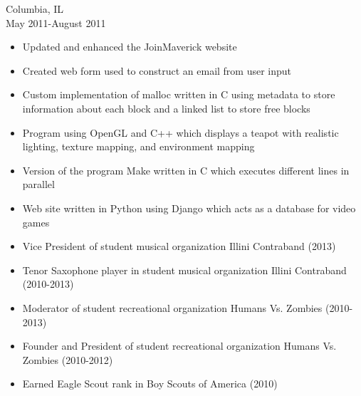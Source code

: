 \documentclass[11pt]{article}
\begin{document}
     \hfill Columbia, IL\\
     \hfill May 2011-August 2011
    \begin{itemize}[noitemsep,topsep=0pt,leftmargin=52pt]
      \item Updated and enhanced the JoinMaverick website
      \item Created web form used to construct an email from user input
    \end{itemize}

  \bigskip

  \begin{itemize}[noitemsep,topsep=0pt]
      \item Custom implementation of malloc written in C using metadata to store information about each block and a linked list to store free blocks
      \item Program using OpenGL and C++ which displays a teapot with realistic lighting, texture mapping, and environment mapping
      \item Version of the program Make written in C which executes different lines in parallel
      \item Web site written in Python using Django which acts as a database for video games
  \end{itemize}

  \bigskip

  \begin{itemize}[noitemsep,topsep=0pt]
    \item Vice President of student musical organization Illini Contraband \hfill (2013)
    \item Tenor Saxophone player in student musical organization Illini Contraband \hfill (2010-2013)
    \item Moderator of student recreational organization Humans Vs. Zombies \hfill (2010-2013)
    \item Founder and President of student recreational organization Humans Vs. Zombies \hfill (2010-2012)
    \item Earned Eagle Scout rank in Boy Scouts of America \hfill (2010)
  \end{itemize}
\end{document}
